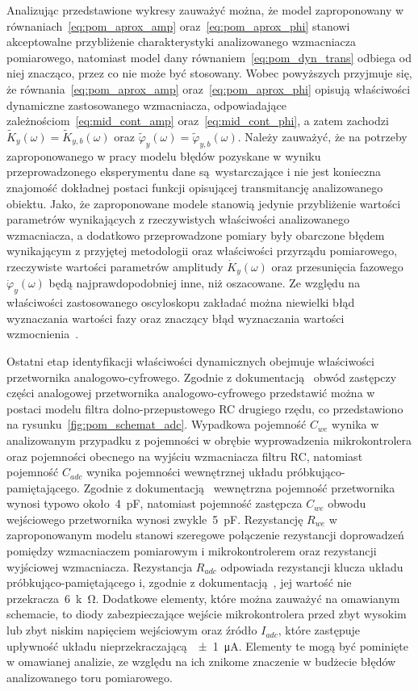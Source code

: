 Analizując przedstawione wykresy zauważyć można, że model zaproponowany w równaniach~\eqref{eq:pom_aprox_amp} oraz~\eqref{eq:pom_aprox_phi} stanowi akceptowalne przybliżenie charakterystyki analizowanego wzmacniacza pomiarowego, natomiast model dany równaniem~\eqref{eq:pom_dyn_trans} odbiega od niej znacząco, przez co nie może być stosowany. Wobec powyższych przyjmuje się, że równania~\eqref{eq:pom_aprox_amp} oraz~\eqref{eq:pom_aprox_phi} opisują właściwości dynamiczne zastosowanego wzmacniacza, odpowiadające zależnościom~\eqref{eq:mid_cont_amp} oraz~\eqref{eq:mid_cont_phi}, a zatem zachodzi $\tilde{K}_{y}(\omega) = \tilde{K}_{y,b}(\omega)$ oraz $\tilde{\varphi}_{y}(\omega) = \tilde{\varphi}_{y,b}(\omega)$. Należy zauważyć, że na potrzeby zaproponowanego w pracy modelu błędów pozyskane w wyniku przeprowadzonego eksperymentu dane są wystarczające i nie jest konieczna znajomość dokładnej postaci funkcji opisującej transmitancję analizowanego obiektu. Jako, że zaproponowane modele stanowią jedynie przybliżenie wartości parametrów wynikających z rzeczywistych właściwości analizowanego wzmacniacza, a dodatkowo przeprowadzone pomiary były obarczone błędem wynikającym z przyjętej metodologii oraz właściwości przyrządu pomiarowego, rzeczywiste wartości parametrów amplitudy $\dot{K}_{y}(\omega)$ oraz przesunięcia fazowego $\dot{\varphi}_{y}(\omega)$ będą najprawdopodobniej inne, niż oszacowane. Ze względu na właściwości zastosowanego oscyloskopu zakładać można niewielki błąd wyznaczania wartości fazy oraz znaczący błąd wyznaczania wartości wzmocnienia~\cite{rigol_dso}.

Ostatni etap identyfikacji właściwości dynamicznych obejmuje właściwości przetwornika analogowo-cyfrowego. Zgodnie z dokumentacją~\cite{stm_f411} obwód zastępczy części analogowej przetwornika analogowo-cyfrowego przedstawić można w postaci modelu filtra dolno-przepustowego RC drugiego rzędu, co przedstawiono na rysunku~\ref{fig:pom_schemat_adc}. Wypadkowa pojemność $C_{we}$ wynika w analizowanym przypadku z pojemności w obrębie wyprowadzenia mikrokontrolera oraz pojemności obecnego na wyjściu wzmacniacza filtru RC, natomiast pojemność $C_{adc}$ wynika pojemności wewnętrznej układu próbkująco-pamiętającego. Zgodnie z dokumentacją~\cite{stm_f411} wewnętrzna pojemność przetwornika wynosi typowo około~\qty{4}{pF}, natomiast pojemność zastępcza $C_{we}$ obwodu wejściowego przetwornika wynosi zwykle~\qty{5}{pF}. Rezystancję $R_{we}$ w zaproponowanym modelu stanowi szeregowe połączenie rezystancji doprowadzeń pomiędzy wzmacniaczem pomiarowym i mikrokontrolerem oraz rezystancji wyjściowej wzmacniacza. Rezystancja $R_{adc}$ odpowiada rezystancji klucza układu próbkująco-pamiętającego i, zgodnie z dokumentacją~\cite{stm_f411}, jej wartość nie przekracza~\qty{6}{k\ohm}. Dodatkowe elementy, które można zauważyć na omawianym schemacie, to diody zabezpieczające wejście mikrokontrolera przed zbyt wysokim lub zbyt niskim napięciem wejściowym oraz źródło $I_{adc}$, które zastępuje upływność układu nieprzekraczającą~\qty{\pm 1}{\micro A}. Elementy te mogą być pominięte w omawianej analizie, ze względu na ich znikome znaczenie w budżecie błędów analizowanego toru pomiarowego.


